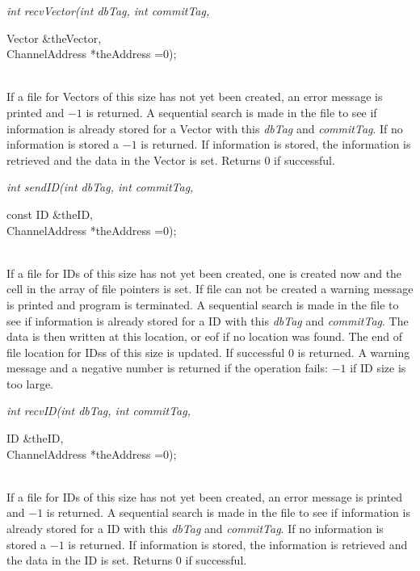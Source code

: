 {\em int recvVector(int dbTag, int commitTag,  

\indent\indent\indent\indent\indent		   Vector \&theVector,  \\
\indent\indent\indent\indent\indent		   ChannelAddress *theAddress =0);}\\
If a file for Vectors of this size has not yet been created, an error message
is printed and $-1$ is returned.  A sequential search
is made in the file to see if information is already stored for a Vector with
this {\em dbTag} and {\em commitTag}. If no information is stored a
$-1$ is returned. If information is stored, the information is
retrieved and the data in the Vector is set. Returns $0$ if
successful. \\

{\em int sendID(int dbTag, int commitTag, 

\indent\indent\indent\indent\indent	   const ID \&theID, \\
\indent\indent\indent\indent\indent	   ChannelAddress *theAddress =0);}\\
If a file
for IDs of this size has not yet been created, one is created now
and the cell in the array of file pointers is set. If file can not be
created a warning message is printed and program is terminated. A sequential search
is made in the file to see if information is already stored for a ID with
this {\em dbTag} and {\em commitTag}. The data is then written at this
location, or eof if no location was found. The end of file location
for IDss of this size is updated. If successful $0$ is
returned. A warning message and a negative number is returned if the
operation fails: $-1$ if ID size is too large. \\

{\em int recvID(int dbTag, int commitTag, 

\indent\indent\indent\indent\indent	   ID \&theID, \\
\indent\indent\indent\indent\indent	   ChannelAddress *theAddress =0);}\\
If a file for IDs of this size has not yet been created, an error message
is printed and $-1$ is returned.  A sequential search
is made in the file to see if information is already stored for a ID with
this {\em dbTag} and {\em commitTag}. If no information is stored a
$-1$ is returned. If information is stored, the information is
retrieved and the data in the ID is set. Returns $0$ if successful. 